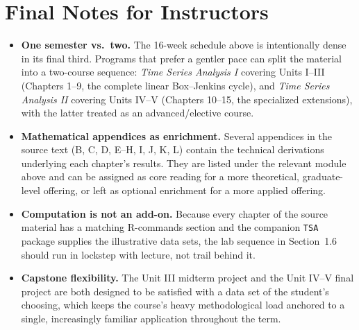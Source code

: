 \documentclass[11pt]{article}
\begin{document}
\section{Final Notes for Instructors}
\begin{itemize}
  \item \textbf{One semester vs.\ two.} The 16-week schedule above is intentionally dense in its final third. Programs that prefer a gentler pace can split the material into a two-course sequence: \emph{Time Series Analysis I} covering Units I--III (Chapters 1--9, the complete linear Box--Jenkins cycle), and \emph{Time Series Analysis II} covering Units IV--V (Chapters 10--15, the specialized extensions), with the latter treated as an advanced/elective course.
  \item \textbf{Mathematical appendices as enrichment.} Several appendices in the source text (B, C, D, E--H, I, J, K, L) contain the technical derivations underlying each chapter's results. They are listed under the relevant module above and can be assigned as core reading for a more theoretical, graduate-level offering, or left as optional enrichment for a more applied offering.
  \item \textbf{Computation is not an add-on.} Because every chapter of the source material has a matching R-commands section and the companion \texttt{TSA} package supplies the illustrative data sets, the lab sequence in Section~1.6 should run in lockstep with lecture, not trail behind it.
  \item \textbf{Capstone flexibility.} The Unit III midterm project and the Unit IV--V final project are both designed to be satisfied with a data set of the student's choosing, which keeps the course's heavy methodological load anchored to a single, increasingly familiar application throughout the term.
\end{itemize}
\end{document}
